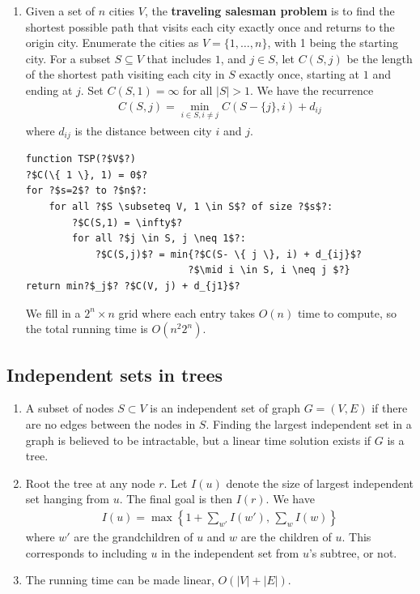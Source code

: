 \documentclass[10pt]{article}
\begin{document}
\begin{multicols}{2}
\begin{addmargin}[0.8em]{0.5em}
\begin{enumerate}[label=(\alph*)]
        \item Given a set of $n$ cities $V$, the \textbf{traveling salesman problem} is to find the shortest possible path that visits each city exactly once and returns to the origin city. Enumerate the cities as $V = \{ 1, \hdots, n \}$, with 1 being the starting city. For a subset $S \subseteq V$ that includes $1$, and $j \in S$, let $C(S,j)$ be the length of the shortest path visiting each city in $S$ exactly once, starting at $1$ and ending at $j$. Set $C(S,1) = \infty$ for all $|S| > 1$. We have the recurrence
        \begin{align*}
        C(S,j) = \min_{i \in S, i \neq j} C(S- \{ j \}, i) + d_{ij}
        \end{align*}
        where $d_{ij}$ is the distance between city $i$ and $j$.
        \begin{verbatim}
function TSP(?$V$?)
?$C(\{ 1 \}, 1) = 0$?
for ?$s=2$? to ?$n$?:
    for all ?$S \subseteq V, 1 \in S$? of size ?$s$?:
        ?$C(S,1) = \infty$?
        for all ?$j \in S, j \neq 1$?:
            ?$C(S,j)$? = min{?$C(S- \{ j \}, i) + d_{ij}$? 
                            ?$\mid i \in S, i \neq j $?}
return min?$_j$? ?$C(V, j) + d_{j1}$?                            
        \end{verbatim}   
        We fill in a $2^n \times n$ grid where each entry takes $O(n)$ time to compute, so the total running time is $O(n^2 2^n)$.
    \end{enumerate}
    
    \vspace{-0.4cm}
    \subsection{Independent sets in trees}
    \vspace{-0.4cm}
    \begin{enumerate}[label=(\alph*)]
        \item A subset of nodes $S \subset V$ is an independent set of graph $G=(V,E)$ if there are no edges between the nodes in $S$. Finding the largest independent set in a graph is believed to be intractable, but a linear time solution exists if $G$ is a tree.
        \item Root the tree at any node $r$. Let $I(u)$ denote the size of largest independent set hanging from $u$. The final goal is then $I(r)$. We have
        \begin{align*}
        I(u) = \max \left\{ 1 + \sum_{w'} I(w'), \, \sum_{w} I(w) \right\}
        \end{align*}
        where $w'$ are the grandchildren of $u$ and $w$ are the children of $u$. This corresponds to including $u$ in the independent set from $u$'s subtree, or not.
        \item The running time can be made linear, $O(|V| + |E|)$.
    \end{enumerate}      
\end{addmargin}


\end{multicols}
\end{document}
